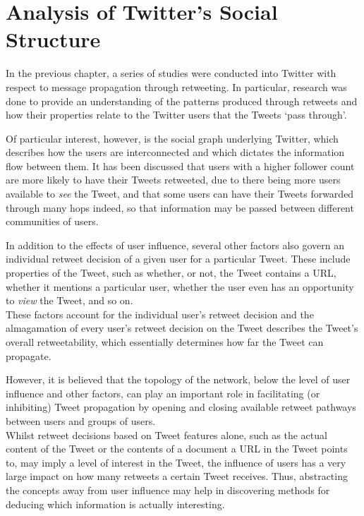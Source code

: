 \chapter{Analysis of Twitter's Social Structure}

In the previous chapter, a series of studies were conducted into Twitter with respect to message propagation through retweeting. In particular, research was done to provide an understanding of the patterns produced through retweets and how their properties relate to the Twitter users that the Tweets `pass through'.

Of particular interest, however, is the social graph underlying Twitter, which describes how the users are interconnected and which dictates the information flow between them. It has been discussed that users with a higher follower count are more likely to have their Tweets retweeted, due to there being more users available to \textit{see} the Tweet, and that some users can have their Tweets forwarded through many hops indeed, so that information may be passed between different communities of users.

In addition to the effects of user influence,  several other factors also govern an individual retweet decision of a given user for a particular Tweet. These include properties of the Tweet, such as whether, or not, the Tweet contains a URL, whether it mentions a particular user, whether the user even has an opportunity to \textit{view} the Tweet, and so on.\\
These factors account for the individual user's retweet decision and the almagamation of every user's retweet decision on the Tweet describes the Tweet's overall retweetability, which essentially determines how far the Tweet can propagate.

However, it is believed that the topology of the network, below the level of user influence and other factors, can play an important role in facilitating (or inhibiting) Tweet propagation by opening and closing available retweet pathways between users and groups of users.\\
Whilst retweet decisions based on Tweet features alone, such as the actual content of the Tweet or the contents of a document a URL in the Tweet points to, may imply a level of interest in the Tweet, the influence of users has a very large impact on how many retweets a certain Tweet receives. Thus, abstracting the concepts away from user influence may help in discovering methods for deducing which information is actually interesting.

